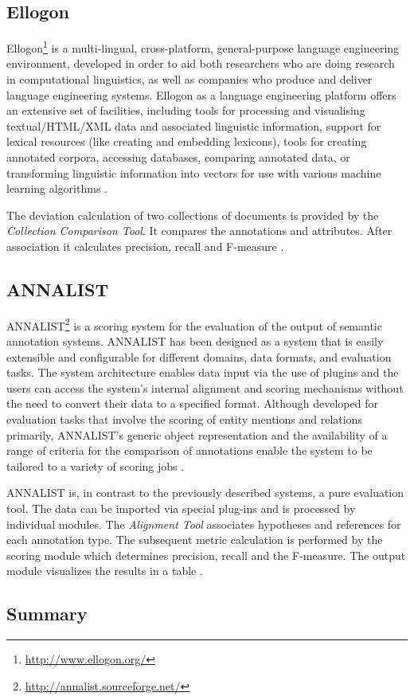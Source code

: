 \subsection{Ellogon}
Ellogon\footnote{\url{http://www.ellogon.org/}} is a multi-lingual, cross-platform, general-purpose language engineering environment, developed in order to aid both researchers who are doing research in computational linguistics, as well as companies who produce and deliver language engineering systems. Ellogon as a language engineering platform offers an extensive set of facilities, including tools for processing and visualising textual/HTML/XML data and associated linguistic information, support for lexical resources (like creating and embedding lexicons), tools for creating annotated corpora, accessing databases, comparing annotated data, or transforming linguistic information into vectors for use with various machine learning algorithms \cite{Ellogon}.

The deviation calculation of two collections of documents is provided by the \textit{Collection Comparison Tool}. It compares the annotations and attributes. After association it calculates precision, recall and F-measure \cite{Linsmayr:2010}.

\subsection{ANNALIST}
\gls{ANNALIST}\footnote{\url{http://annalist.sourceforge.net/}} is a scoring system for the evaluation of the output of semantic annotation systems. ANNALIST has been designed as a system that is easily extensible and configurable for different domains, data formats, and evaluation tasks. The system architecture enables data input via the use of plugins and the users can access the system’s internal alignment and scoring mechanisms without the need to convert their data to a specified format. Although developed for evaluation tasks that involve the scoring of entity mentions and relations primarily, ANNALIST's generic object representation and the availability of a range of criteria for the comparison of annotations enable the system to be tailored to a variety of scoring jobs \cite{Demetriou:2008}.

ANNALIST is, in contrast to the previously described systems, a pure evaluation tool. The data can be imported via special plug-ins and is processed by individual modules. The \textit{Alignment Tool} associates hypotheses and references for each annotation type. The subsequent metric calculation is performed by the scoring module which determines precision, recall and the F-measure. The output module visualizes the results in a table \cite{Linsmayr:2010}.

\subsection{Summary}
